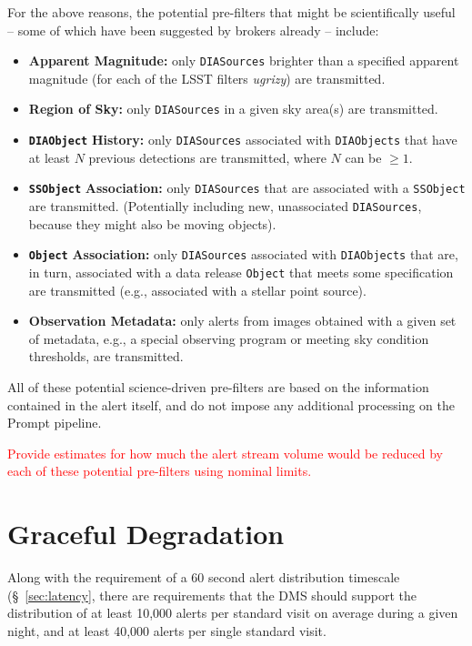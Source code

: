 \documentclass[DM,lsstdraft,authoryear,toc]{lsstdoc}
\begin{document}
For the above reasons, the potential pre-filters that might be scientifically useful -- some of which have been suggested by brokers already -- include:
\begin{itemize}
\item {\bf Apparent Magnitude: } only {\tt DIASources} brighter than a specified apparent magnitude (for each of the LSST filters {\it ugrizy}) are transmitted. 
\item {\bf Region of Sky: } only {\tt DIASources} in a given sky area(s) are transmitted. 
\item \texttt{\bf DIAObject} {\bf History: } only {\tt DIASources} associated with {\tt DIAObjects} that have at least $N$ previous detections are transmitted, where $N$ can be $\geq1$. 
\item \texttt{\bf SSObject} {\bf Association: } only {\tt DIASources} that are associated with a {\tt SSObject} are transmitted. (Potentially including new, unassociated {\tt DIASources}, because they might also be moving objects).
\item \texttt{\bf Object} {\bf Association: } only {\tt DIASources} associated with {\tt DIAObjects} that are, in turn, associated with a data release {\tt Object} that meets some specification are transmitted (e.g., associated with a stellar point source).
\item {\bf Observation Metadata: } only alerts from images obtained with a given set of metadata, e.g., a special observing program or meeting sky condition thresholds, are transmitted.
\end{itemize}

All of these potential science-driven pre-filters are based on the information contained in the alert itself, and do not impose any additional processing on the Prompt pipeline.
 
\textcolor{red}{Provide estimates for how much the alert stream volume would be reduced by each of these potential pre-filters using nominal limits.}



\clearpage
\section{Graceful Degradation} \label{sec:graceful}

Along with the requirement of a 60 second alert distribution timescale (\S~\ref{sec:latency}, there are requirements that the DMS should support the distribution of at least 10,000 alerts per standard visit on average during a given night, and at least 40,000 alerts per single standard visit. 
\end{document}
